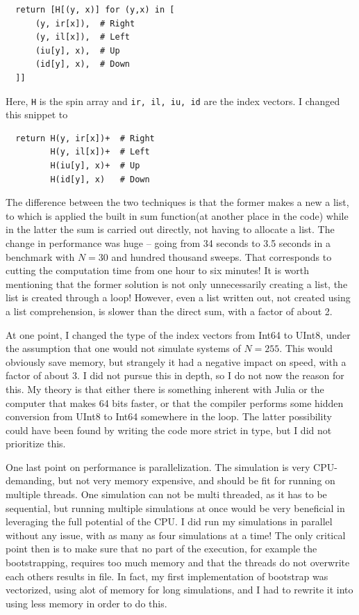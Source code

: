 \documentclass[12pt, a4paper]{article}
\begin{document}
\begin{lstlisting}
  return [H[(y, x)] for (y,x) in [
      (y, ir[x]),  # Right
      (y, il[x]),  # Left
      (iu[y], x),  # Up
      (id[y], x),  # Down
  ]]
\end{lstlisting}
Here, \verb|H| is the spin array and \verb|ir, il, iu, id| are the index vectors.
I changed this snippet to
\begin{lstlisting}
  return H(y, ir[x])+  # Right
         H(y, il[x])+  # Left
         H(iu[y], x)+  # Up
         H(id[y], x)   # Down
\end{lstlisting}
The difference between the two techniques is that the former makes a new a list, to which is applied the built in sum function(at another place in the code) while in the latter the sum is carried out directly, not having to allocate a list.
The change in performance was huge -- going from 34 seconds to 3.5 seconds in a benchmark with $N=30$ and hundred thousand sweeps.
That corresponds to cutting the computation time from one hour to six minutes!
It is worth mentioning that the former solution is not only unnecessarily creating a list, the list is created through a loop!
However, even a list written out, not created using a list comprehension, is slower than the direct sum, with a factor of about 2.

At one point, I changed the type of the index vectors from Int64 to UInt8, under the assumption that one would not simulate systems of $N=255$.
This would obviously save memory, but strangely it had a negative impact on speed, with a factor of about 3.
I did not pursue this in depth, so I do not now the reason for this.
My theory is that either there is something inherent with Julia or the computer that makes 64 bits faster, or that the compiler performs some hidden conversion from UInt8 to Int64 somewhere in the loop.
The latter possibility could have been found by writing the code more strict in type, but I did not prioritize this.


One last point on performance is parallelization.
The simulation is very CPU-demanding, but not very memory expensive, and should be fit for running on multiple threads.
One simulation can not be multi threaded, as it has to be sequential, but running multiple simulations at once would be very beneficial in leveraging the full potential of the CPU.
I did run my simulations in parallel without any issue, with as many as four simulations at a time!
The only critical point then is to make sure that no part of the execution, for example the bootstrapping, requires too much memory and that the threads do not overwrite each others results in file.
In fact, my first implementation of bootstrap was vectorized, using alot of memory for long simulations, and I had to rewrite it into using less memory in order to do this.
\end{document}
